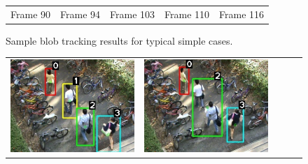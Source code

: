 \begin{frame}
\begin{figure}
\begin{tabular}{ccccc}
            \\
            \small Frame 90 & 
            \small Frame 94 & 
            \small Frame 103 & 
            \small Frame 110 & 
            \small Frame 116
        \end{tabular}
        \caption{Sample blob tracking results for typical simple
            cases.}
        \label{fig:normal-tracking-results}
    \end{figure}

    \begin{figure}
        \centering
        \begin{tabular}{ccccc}
            \includegraphics[scale=0.17]{figures/complex-tracking-result-0125} &
            \includegraphics[scale=0.17]{figures/complex-tracking-result-0131} &

\end{tabular}
\end{figure}
\end{frame}
